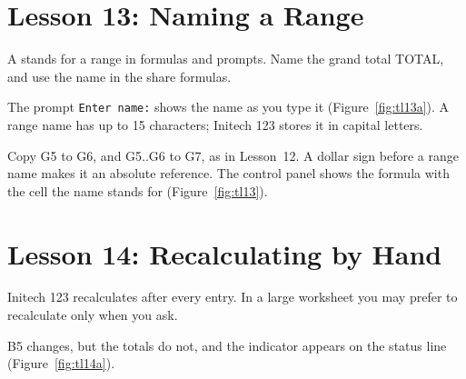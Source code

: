 \section{Lesson 13: Naming a Range}
A  stands for a range in formulas and prompts.  Name the
grand total TOTAL, and use the name in the share formulas.

\begin{Keystrokes}
\end{Keystrokes}
The prompt \texttt{Enter name:} shows the name as you type it
(Figure~\ref{fig:tl13a}).  A range name has up to 15 characters; Initech
123 stores it in capital letters.
\begin{Keystrokes}
\end{Keystrokes}
Copy G5 to G6, and G5..G6 to G7, as in Lesson~12.  A dollar sign before a
range name makes it an absolute reference.  The control panel shows the
formula with the cell the name stands for (Figure~\ref{fig:tl13}).

\section{Lesson 14: Recalculating by Hand}
Initech 123 recalculates after every entry.  In a large worksheet you may
prefer to recalculate only when you ask.

\begin{Keystrokes}
\end{Keystrokes}
B5 changes, but the totals do not, and the  indicator appears on
the status line (Figure~\ref{fig:tl14a}).
\begin{Keystrokes}
\end{Keystrokes}
\begin{Keystrokes}
\end{Keystrokes}

